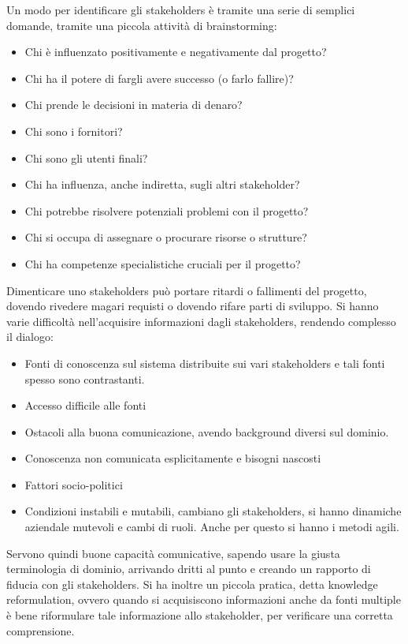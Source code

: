 Un modo per identificare gli stakeholders è tramite una serie di semplici domande,
tramite una piccola attività di brainstorming:
\begin{itemize}
      \item Chi è influenzato positivamente e negativamente dal progetto?
      \item Chi ha il potere di fargli avere successo (o farlo fallire)?
      \item Chi prende le decisioni in materia di denaro?
      \item Chi sono i fornitori?
      \item Chi sono gli utenti finali?
      \item Chi ha influenza, anche indiretta, sugli altri stakeholder?
      \item Chi potrebbe risolvere potenziali problemi con il progetto?
      \item Chi si occupa di assegnare o procurare risorse o strutture?
      \item Chi ha competenze specialistiche cruciali per il progetto?
\end{itemize}
Dimenticare uno stakeholders può portare ritardi o fallimenti del progetto, dovendo
rivedere magari requisti o dovendo rifare parti di sviluppo. Si hanno varie
difficoltà nell'acquisire informazioni dagli stakeholders, rendendo complesso il dialogo:
\begin{itemize}
      \item Fonti di conoscenza sul sistema distribuite sui vari stakeholders e tali
            fonti spesso sono contrastanti.
      \item Accesso difficile alle fonti
      \item Ostacoli alla buona comunicazione, avendo background diversi sul dominio.
      \item Conoscenza non comunicata esplicitamente e bisogni nascosti
      \item Fattori socio-politici
      \item Condizioni instabili e mutabili, cambiano gli stakeholders, si hanno
            dinamiche aziendale mutevoli e cambi di ruoli. Anche per questo si hanno i metodi agili.
\end{itemize}

Servono quindi buone capacità comunicative, sapendo usare la giusta terminologia
di dominio, arrivando dritti al punto e creando un rapporto di fiducia con gli
stakeholders. Si ha inoltre un piccola pratica, detta knowledge reformulation,
ovvero quando si acquisiscono informazioni anche da fonti multiple è bene riformulare
tale informazione allo stakeholder, per verificare una corretta comprensione.

